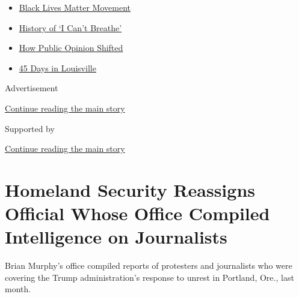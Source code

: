\begin{itemize}
\tightlist
\item
  \href{https://www.nytimes3xbfgragh.onion/interactive/2020/07/03/us/george-floyd-protests-crowd-size.html?name=styln-george-floyd\&region=TOP_BANNER\&variant=undefined\&block=storyline_menu_recirc\&action=click\&pgtype=Article\&impression_id=dc3cef21-e393-11ea-adda-c17bab336bc5}{Black
  Lives Matter Movement}
\item
  \href{https://www.nytimes3xbfgragh.onion/interactive/2020/06/28/us/i-cant-breathe-police-arrest.html?name=styln-george-floyd\&region=TOP_BANNER\&variant=undefined\&block=storyline_menu_recirc\&action=click\&pgtype=Article\&impression_id=dc3cef22-e393-11ea-adda-c17bab336bc5}{History
  of `I Can't Breathe'}
\item
  \href{https://www.nytimes3xbfgragh.onion/interactive/2020/06/10/upshot/black-lives-matter-attitudes.html?name=styln-george-floyd\&region=TOP_BANNER\&variant=undefined\&block=storyline_menu_recirc\&action=click\&pgtype=Article\&impression_id=dc3d1630-e393-11ea-adda-c17bab336bc5}{How
  Public Opinion Shifted}
\item
  \href{https://www.nytimes3xbfgragh.onion/interactive/2020/07/16/us/black-lives-matter-protests-louisville-breonna-taylor.html?name=styln-george-floyd\&region=TOP_BANNER\&variant=undefined\&block=storyline_menu_recirc\&action=click\&pgtype=Article\&impression_id=dc3d1631-e393-11ea-adda-c17bab336bc5}{45
  Days in Louisville}
\end{itemize}

Advertisement

\protect\hyperlink{after-top}{Continue reading the main story}

Supported by

\protect\hyperlink{after-sponsor}{Continue reading the main story}

\hypertarget{homeland-security-reassigns-official-whose-office-compiled-intelligence-on-journalists}{%
\section{Homeland Security Reassigns Official Whose Office Compiled
Intelligence on
Journalists}\label{homeland-security-reassigns-official-whose-office-compiled-intelligence-on-journalists}}

Brian Murphy's office compiled reports of protesters and journalists who
were covering the Trump administration's response to unrest in Portland,
Ore., last month.

